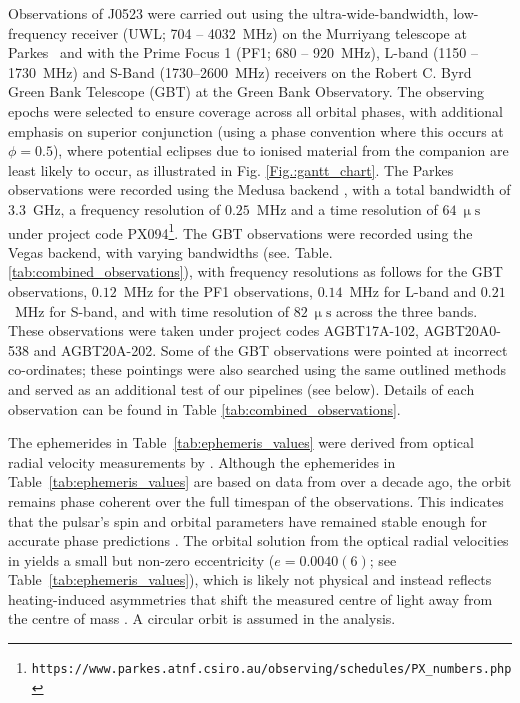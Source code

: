 Observations of J0523 were carried out using the ultra-wide-bandwidth, low-frequency receiver (UWL; 704 -- 4032~MHz) on the Murriyang telescope at Parkes~\citep{hobbs_ultra-wide_2020} and with the Prime Focus 1 (PF1; 680 -- 920~MHz), L-band (1150 -- 1730~MHz) and S-Band (1730--2600~MHz) receivers on the Robert C. Byrd Green Bank Telescope (GBT) at the Green Bank Observatory. The observing epochs were selected to ensure coverage across all orbital phases, with additional emphasis on superior conjunction (using a phase convention where this occurs at $\phi = 0.5$), where potential eclipses due to ionised material from the companion are least likely to occur, as illustrated in Fig. \ref{Fig.:gantt_chart}.  The Parkes observations were recorded using the Medusa backend \citep{hobbs_ultra-wide_2020}, with a total bandwidth of $3.3$~GHz, a frequency resolution of $0.25$~MHz and a time resolution of $64~\upmu\text{s}$ under project code PX094\footnote{\scriptsize{\texttt{https://www.parkes.atnf.csiro.au/observing/schedules/PX\_numbers.php}}}. The GBT observations were recorded using the Vegas backend, with varying bandwidths (see. Table. \ref{tab:combined_observations}), with frequency resolutions as follows for the GBT observations, $0.12$~MHz for the PF1 observations, $0.14$~MHz for L-band and $0.21$~MHz for S-band, and with time resolution of $82~\upmu\text{s}$ across the three bands. These observations were taken under project codes AGBT17A-102, AGBT20A0-538 and AGBT20A-202. Some of the GBT observations were pointed at incorrect co-ordinates; these pointings were also searched using the same outlined methods and served as an additional test of our pipelines (see below). Details of each observation can be found in Table \ref{tab:combined_observations}. 

The ephemerides in Table~\ref{tab:ephemeris_values} were derived from optical radial velocity measurements by \cite{strader_1fgl_2014}. Although the ephemerides in Table~\ref{tab:ephemeris_values} are based on data from over a decade ago, the orbit remains phase coherent over the full timespan of the observations. This indicates that the pulsar's spin and orbital parameters have remained stable enough for accurate phase predictions \citep{strader_1fgl_2014,halpern_luminous_2022}. The orbital solution from the optical radial velocities in \citet{strader_1fgl_2014} yields a small but non-zero eccentricity (\(e = 0.0040(6)\); see Table~\ref{tab:ephemeris_values}), which is likely not physical and instead reflects heating-induced asymmetries that shift the measured centre of light away from the centre of mass \citep{halpern_luminous_2022}. A circular orbit is assumed in the analysis.


